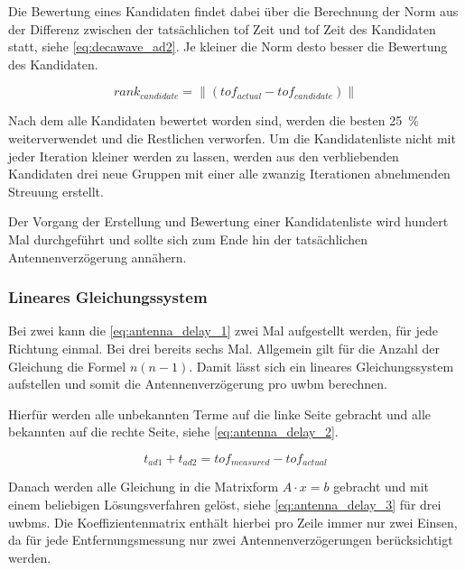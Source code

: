 Die Bewertung eines Kandidaten findet dabei über die Berechnung der Norm aus der Differenz zwischen der tatsächlichen \Gls{tof} Zeit und \Gls{tof} Zeit des Kandidaten statt, siehe \autoref{eq:decawave_ad2}. Je kleiner die Norm desto besser die Bewertung des Kandidaten.

\begin{equation}
rank_{candidate}=\lVert (tof_{actual} - tof_{candidate}) \lVert\label{eq:decawave_ad2}
\end{equation}

Nach dem alle Kandidaten bewertet worden sind, werden die besten \SI{25}{\percent} weiterverwendet und die Restlichen verworfen. Um die Kandidatenliste nicht mit jeder Iteration kleiner werden zu lassen, werden aus den verbliebenden Kandidaten drei neue Gruppen mit einer alle zwanzig Iterationen abnehmenden Streuung erstellt.

Der Vorgang der Erstellung und Bewertung einer Kandidatenliste wird hundert Mal durchgeführt und sollte sich zum Ende hin der tatsächlichen Antennenverzögerung annähern.


%
%
%
\subsubsection{Lineares Gleichungssystem}

Bei zwei  kann die \autoref{eq:antenna_delay_1} zwei Mal aufgestellt werden, für jede Richtung einmal. Bei drei  bereits sechs Mal. Allgemein gilt für die Anzahl der Gleichung die Formel $n(n-1)$. Damit lässt sich ein lineares Gleichungssystem aufstellen und somit die Antennenverzögerung pro \Gls{uwbm} berechnen.

Hierfür werden alle unbekannten Terme auf die linke Seite gebracht und alle bekannten auf die rechte Seite, siehe \autoref{eq:antenna_delay_2}.

\begin{equation}
t_{ad1} + t_{ad2} = tof_{measured} - tof_{actual} \label{eq:antenna_delay_2}
\end{equation}

Danach werden alle Gleichung in die Matrixform $A\cdot x=b$ gebracht und mit einem beliebigen Lösungsverfahren gelöst, siehe \autoref{eq:antenna_delay_3} für drei \Glspl{uwbm}. Die Koeffizientenmatrix enthält hierbei pro Zeile immer nur zwei Einsen, da für jede Entfernungsmessung nur zwei Antennenverzögerungen berücksichtigt werden.


